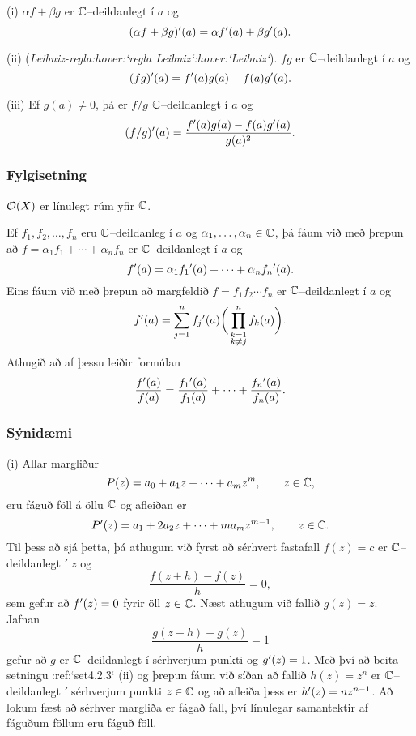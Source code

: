 \smallskip\noindent
(i) $\alpha f+\beta g$ er ${\mathbb C}$--deildanlegt í $a$ og 
 $$
(\alpha f+\beta g){\sp{\prime}}(a)=\alpha f{\sp{\prime}}(a)+\beta g{\sp{\prime}}(a).
 $$

\smallskip\noindent
(ii) ({\it Leibniz-regla:hover:`regla Leibniz`:hover:`Leibniz`}). $fg$ er ${\mathbb C}$--deildanlegt í $a$ og
$$
(fg){\sp{\prime}}(a)=f{\sp{\prime}}(a)g(a)+f(a)g{\sp{\prime}}(a).
$$

\smallskip\noindent
(iii) Ef $g(a)\neq 0$, þá er $f/g$ ${\mathbb C}$--deildanlegt í $a$ og 
$$(f/g){\sp{\prime}}(a)=\dfrac{f{\sp{\prime}}(a)g(a)-f(a)g{\sp{\prime}}(a)}{g(a)^2}.$$




\subsubsection{Fylgisetning}
${\cal O}(X)$ er línulegt rúm yfir ${\mathbb C}$.


Ef $f_1,f_2,\dots, f_n$ eru
${\mathbb C}$--deildanleg í  $a$ og $\alpha_1,\dots,\alpha_n\in {\mathbb C}$, þá fáum við
með þrepun að
$f=\alpha_1f_1+\cdots+\alpha_nf_n$ er ${\mathbb C}$--deildanlegt í $a$ og
 $$f{\sp{\prime}}(a)=\alpha_1 f_1{\sp{\prime}}(a)+\cdots+\alpha_nf_n{\sp{\prime}}(a).
 $$
Eins fáum við með þrepun að margfeldið $f=f_1f_2\cdots f_n$ er
${\mathbb C}$--deildanlegt í $a$ og
 $$f{\sp{\prime}}(a)= \sum_{j=1}^n f_j{\sp{\prime}}(a)\bigg(\prod_{\substack{ k=1\\ k\neq
 j}}^n f_k(a)\bigg).
 $$
Athugið að af þessu leiðir formúlan
 $$\dfrac{f{\sp{\prime}}(a)}{f(a)} =  \dfrac{f_1{\sp{\prime}}(a)}{f_1(a)}+\cdots+
\dfrac{f_n{\sp{\prime}}(a)}{f_n(a)}.
 $$


\subsubsection{Sýnidæmi} (i) Allar margliður
 $$P(z)= a_0+a_1z+\cdots+a_mz^m, \qquad z\in {\mathbb C},
 $$
eru fáguð föll á öllu ${\mathbb C}$ og afleiðan er
 $$P{\sp{\prime}}(z)= a_1+2a_2z+\cdots+ma_mz^{m-1}, \qquad z\in {\mathbb C}.
 $$
Til þess að sjá þetta, þá athugum við fyrst að sérhvert fastafall
$f(z)=c$ er ${\mathbb C}$--deildanlegt í $z$ og 
 $$\dfrac {f(z+h)-f(z)}h=0,
 $$
sem gefur að $f{\sp{\prime}}(z)=0$ fyrir öll $z\in {\mathbb C}$.  Næst athugum við 
fallið $g(z)=z$. Jafnan
 $$\dfrac{g(z+h)-g(z)}h=1
 $$
gefur að $g$ er ${\mathbb C}$--deildanlegt í sérhverjum punkti og
$g{\sp{\prime}}(z)=1$.  Með því að beita setningu :ref:`set4.2.3` (ii) og
þrepun fáum við síðan að fallið $h(z)=z^n$ er
${\mathbb C}$--deildanlegt í sérhverjum punkti $z\in {\mathbb C}$ og að afleiða þess er
$h{\sp{\prime}}(z)=nz^{n-1}$.  Að lokum fæst að sérhver margliða er fágað
fall, því línulegar samantektir af fáguðum föllum eru fáguð föll.



